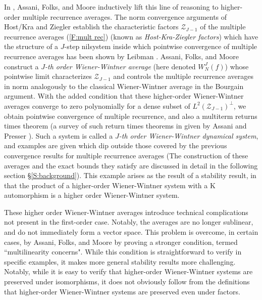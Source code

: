 \documentclass[11pt, oneside]{amsart}   	%
\newcommand{\1}{\mathbbm{1}}
\theoremstyle{definition}
\begin{document}
In \cite{assani2024higherorderwienerwintnersystems}, Assani, Folks, and Moore inductively lift this line of reasoning to higher-order multiple recurrence averages. The norm convergence arguments of Host/Kra and Ziegler establish the characteristic factors $\mathcal{Z}_{J-1}$ of the multiple recurrence averages (\ref{F:mult rec}) (known as \textit{Host-Kra-Ziegler factors}) which have the structure of a $J$-step nilsystem inside which pointwise convergence of multiple recurrence averages has been shown by Leibman \cite{leibman05a}. Assani, Folks, and Moore \cite{assani2024higherorderwienerwintnersystems} construct a \textit{$J$-th order Wiener-Wintner average} (here denoted $W_N^J(f)$) whose pointwise limit characterizes $\mathcal{Z}_{J-1}$ and controls the multiple recurrence averages in norm analogously to the classical Wiener-Wintner average in the Bourgain argument. With the added condition that these higher-order Wiener-Wintner averages converge to zero polynomially for a dense subset of $L^2(\mathcal{Z}_{J-1})^\perp$, we obtain pointwise convergence of multiple recurrence, and also a multiterm returns times theorem (a survey of such return times theorems in given by Assani and Presser \cite{AssaniPresser+2014+19+58}). Such a system is called a \textit{$J$-th order Wiener-Wintner dynamical system}, and examples are given which dip outside those covered by the previous convergence results for multiple recurrence averages \cite{assani2024higherorderwienerwintnersystems}
(The construction of these averages and the exact bounds they satisfy are discussed in detail in the following section \S \ref{S:background}). This example arises as the result of a stability result, in that the product of a higher-order Wiener-Wintner system with a K automorphism is a higher order Wiener-Wintner system.

These higher order Wiener-Wintner averages introduce technical complications not present in the first-order case. Notably, the averages are no longer sublinear, and do not immediately form a vector space. This problem is overcome, in certain cases, by Assani, Folks, and Moore  \cite{assani2024higherorderwienerwintnersystems} 
by proving a stronger condition, termed ``multilinearity concerns". While this condition is straightforward to verify in specific examples, it makes more general stability results more challenging. Notably, while it is easy to verify that higher-order Wiener-Wintner systems are preserved under isomorphisms, it does not obviously follow from the definitions that higher-order Wiener-Wintner systems are preserved even under factors.
\end{document}
